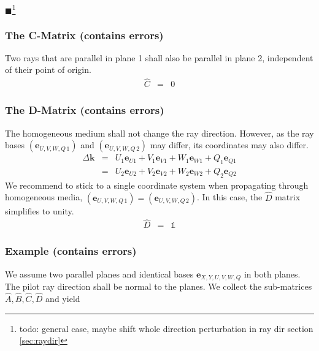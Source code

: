 \documentclass[12pt,a4paper,twoside,openright,BCOR10mm,headsepline,titlepage,abstracton,chapterprefix,final]{scrreprt}
\newcommand\Vector[1]{{\mathbf{#1}}}
\newcommand\wavenumber{k}
\newcommand\Wavevector{\Vector{\wavenumber}}
\newcommand\unittensor{\mathds{1}}
\newcommand{\remark}[1]{{\color{red}$\blacksquare$}\footnote{{\color{red}#1}}}
\begin{document}
\remark{todo: general case, maybe shift whole direction perturbation in ray dir section \ref{sec:raydir}}

\subsubsection{The C-Matrix (contains errors)} 
Two rays that are parallel in plane 1 shall also be parallel in plane 2, 
independent of their point of origin.
\begin{eqnarray}
\hat{C} &=& 0 
\end{eqnarray}

\subsubsection{The D-Matrix (contains errors)}
The homogeneous medium shall not change the ray direction.
However, as the ray bases $( \Vector{e}_{U,V,W,Q\,1} )$ and $( \Vector{e}_{U,V,W,Q\,2} )$
may differ, its coordinates may also differ.
\begin{eqnarray}
 \Delta \Wavevector 
 &=& U_1 \Vector{e}_{U1} + V_1 \Vector{e}_{V1} + W_1 \Vector{e}_{W1} + Q_1 \Vector{e}_{Q1} \nonumber \\
 &=& U_2 \Vector{e}_{U2} + V_2 \Vector{e}_{V2} + W_2 \Vector{e}_{W2} + Q_2 \Vector{e}_{Q2}
\end{eqnarray}
We recommend to stick to a single coordinate system when propagating through homogeneous media, 
$( \Vector{e}_{U,V,W,Q\,1} ) = ( \Vector{e}_{U,V,W,Q\,2} )$. 
In this case, the $\hat{D}$ matrix simplifies to unity.
\begin{eqnarray}
 \hat{D} &=& \unittensor
\end{eqnarray}


\subsubsection{Example (contains errors)}
We assume two parallel planes and identical bases $\Vector{e}_{X,Y,U,V,W,Q}$ in both planes. 
The pilot ray direction shall be normal to the planes.
We collect the sub-matrices $\hat{A}, \hat{B}, \hat{C}, \hat{D}$ and yield
\end{document}
